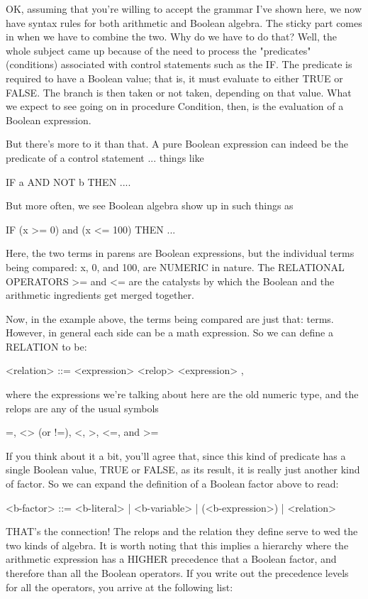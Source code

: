 \documentclass[float=false, crop=false]{standalone}
\begin{document}
OK, assuming that you're willing to accept the grammar I've shown here, we now
have syntax rules for both arithmetic and Boolean algebra. The sticky part comes
in when we have to combine the two. Why do we have to do that? Well, the whole
subject came up because of the need to process the "predicates" (conditions)
associated with control statements such as the IF. The predicate is required to
have a Boolean value; that is, it must evaluate to either TRUE or FALSE. The
branch is then taken or not taken, depending on that value. What we expect to
see going on in procedure Condition, then, is the evaluation of a Boolean
expression.

But there's more to it than that. A pure Boolean expression can indeed be the
predicate of a control statement ... things like


          IF a AND NOT b THEN ....


But more often, we see Boolean algebra show up in such things as


     IF (x >= 0) and (x <= 100) THEN ...


Here, the two terms in parens are Boolean expressions, but the individual terms
being compared: x, 0, and 100, are NUMERIC in nature. The RELATIONAL OPERATORS
>= and <= are the catalysts by which the Boolean and the arithmetic ingredients
get merged together.

Now, in the example above, the terms being compared are just that: terms.
However, in general each side can be a math expression. So we can define a
RELATION to be:


     <relation> ::= <expression> <relop> <expression>  ,


where the expressions we're talking about here are the old numeric type, and the
relops are any of the usual symbols


               =, <> (or !=), <, >, <=, and >=


If you think about it a bit, you'll agree that, since this kind of predicate has
a single Boolean value, TRUE or FALSE, as its result, it is really just another
kind of factor. So we can expand the definition of a Boolean factor above to
read:

    <b-factor> ::=    <b-literal>
                    | <b-variable>
                    | (<b-expression>)
                    | <relation>

THAT's the connection! The relops and the relation they define serve to wed the
two kinds of algebra. It is worth noting that this implies a hierarchy where the
arithmetic expression has a HIGHER precedence that a Boolean factor, and
therefore than all the Boolean operators. If you write out the precedence levels
for all the operators, you arrive at the following list:
\end{document}
